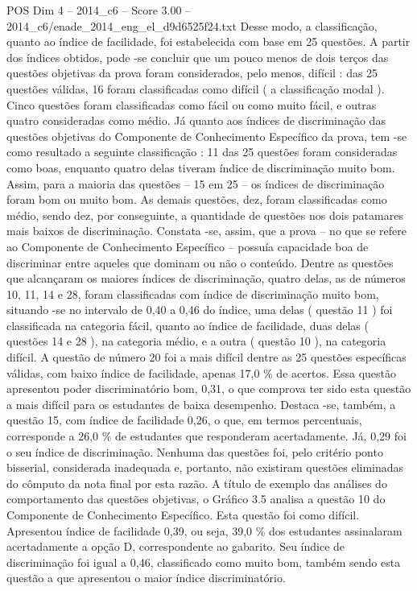 \begin{textsample}{POS Dim 4 – 2014\_c6 – Score 3.00 – 2014\_c6/enade\_2014\_eng\_el\_d9d6525f24.txt}
Desse modo, a classificação, quanto ao índice de facilidade, foi estabelecida com base em 25 questões.
A partir dos índices obtidos, pode -se concluir que um pouco menos de dois terços das questões objetivas da prova foram considerados, pelo menos, difícil : das 25 questões válidas, 16 foram classificadas como difícil ( a classificação modal ).
Cinco questões foram classificadas como fácil ou como muito fácil, e outras quatro consideradas como médio.
Já quanto aos índices de discriminação das questões objetivas do Componente de Conhecimento Específico da prova, tem -se como resultado a seguinte classificação : 11 das 25 questões foram consideradas como boas, enquanto quatro delas tiveram índice de discriminação muito bom.
Assim, para a maioria das questões – 15 em 25 – os índices de discriminação foram bom ou muito bom.
As demais questões, dez, foram classificadas como médio, sendo dez, por conseguinte, a quantidade de questões nos dois patamares mais baixos de discriminação.
Constata -se, assim, que a prova – no que se refere ao Componente de Conhecimento Específico – possuía capacidade boa de discriminar entre aqueles que dominam ou não o conteúdo.
Dentre as questões que alcançaram os maiores índices de discriminação, quatro delas, as de números 10, 11, 14 e 28, foram classificadas com índice de discriminação muito bom, situando -se no intervalo de 0,40 a 0,46 do índice, uma delas ( questão 11 ) foi classificada na categoria fácil, quanto ao índice de facilidade, duas delas ( questões 14 e 28 ), na categoria médio, e a outra ( questão 10 ), na categoria difícil.
A questão de número 20 foi a mais difícil dentre as 25 questões específicas válidas, com baixo índice de facilidade, apenas 17,0 \% de acertos.
Essa questão apresentou poder discriminatório bom, 0,31, o que comprova ter sido esta questão a mais difícil para os estudantes de baixa desempenho.
Destaca -se, também, a questão 15, com índice de facilidade 0,26, o que, em termos percentuais, corresponde a 26,0 \% de estudantes que responderam acertadamente.
Já, 0,29 foi o seu índice de discriminação.
Nenhuma das questões foi, pelo critério ponto bisserial, considerada inadequada e, portanto, não existiram questões eliminadas do cômputo da nota final por esta razão.
A título de exemplo das análises do comportamento das questões objetivas, o Gráfico 3.5 analisa a questão 10 do Componente de Conhecimento Específico.
Esta questão foi como difícil.
Apresentou índice de facilidade 0,39, ou seja, 39,0 \% dos estudantes assinalaram acertadamente a opção D, correspondente ao gabarito.
Seu índice de discriminação foi igual a 0,46, classificado como muito bom, também sendo esta questão a que apresentou o maior índice discriminatório.

\end{textsample}
